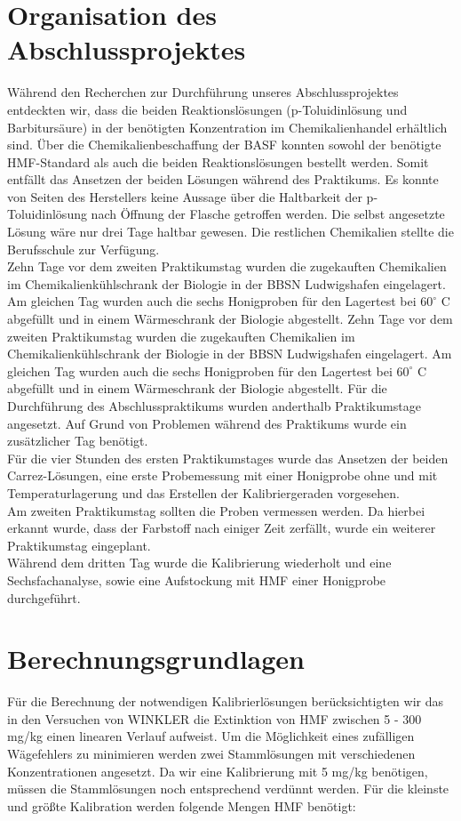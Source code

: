 \section{Organisation des Abschlussprojektes}
Während den Recherchen zur Durchführung unseres Abschlussprojektes entdeckten wir, dass die beiden Reaktionslösungen (p-Toluidinlösung und Barbitursäure) in der benötigten Konzentration im Chemikalienhandel erhältlich sind. Über die Chemikalienbeschaffung der BASF konnten sowohl der benötigte HMF-Standard als auch die beiden Reaktionslösungen bestellt werden. Somit entfällt das Ansetzen der beiden Lösungen während des Praktikums. Es konnte von Seiten des Herstellers keine Aussage über die Haltbarkeit der p-Toluidinlösung nach Öffnung der Flasche getroffen werden. Die selbst angesetzte Lösung wäre nur drei Tage haltbar gewesen. Die restlichen Chemikalien stellte die Berufsschule zur Verfügung. \\
Zehn Tage vor dem zweiten Praktikumstag wurden die zugekauften Chemikalien im Chemikalienkühlschrank der Biologie in der BBSN Ludwigshafen eingelagert. Am gleichen Tag wurden auch die sechs Honigproben für den Lagertest bei $60^\circ$ C abgefüllt und in einem Wärmeschrank der Biologie abgestellt.
Zehn Tage vor dem zweiten Praktikumstag wurden die zugekauften Chemikalien im Chemikalienkühlschrank der Biologie in der BBSN Ludwigshafen eingelagert. Am gleichen Tag wurden auch die sechs Honigproben für den Lagertest bei $60^\circ$ C abgefüllt und in einem Wärmeschrank der Biologie abgestellt.
Für die Durchführung des Abschlusspraktikums wurden anderthalb Praktikumstage angesetzt. Auf Grund von Problemen während des Praktikums wurde ein zusätzlicher Tag benötigt. \\
Für die vier Stunden des ersten Praktikumstages wurde das Ansetzen der beiden Carrez-Lösungen, eine erste Probemessung mit einer Honigprobe ohne und mit Temperaturlagerung und das Erstellen der Kalibriergeraden vorgesehen.\\
Am zweiten Praktikumstag sollten die Proben vermessen werden. Da hierbei erkannt wurde, dass der Farbstoff nach einiger Zeit zerfällt, wurde ein weiterer Praktikumstag eingeplant.\\
Während dem dritten Tag wurde die Kalibrierung wiederholt und eine Sechsfachanalyse, sowie eine Aufstockung mit HMF einer Honigprobe durchgeführt.\\

\section{Berechnungsgrundlagen}
Für die Berechnung der notwendigen Kalibrierlösungen berücksichtigten wir das in den Versuchen von WINKLER die Extinktion von HMF zwischen 5 - 300 mg/kg einen linearen Verlauf aufweist. Um die Möglichkeit eines zufälligen Wägefehlers zu minimieren werden zwei Stammlösungen mit verschiedenen Konzentrationen angesetzt. Da wir eine Kalibrierung mit 5 mg/kg benötigen, müssen die Stammlösungen noch entsprechend verdünnt werden. Für die kleinste und größte Kalibration werden folgende Mengen HMF benötigt:

